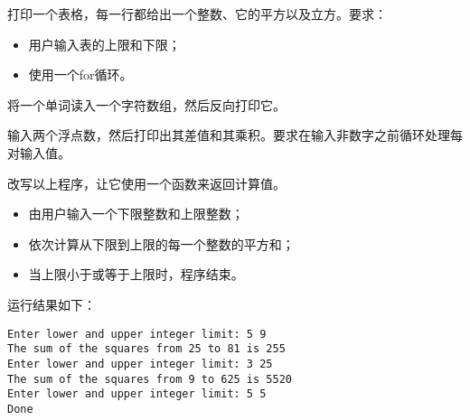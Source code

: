 \begin{frame}[fragile]
\begin{biancheng}[5]
打印一个表格，每一行都给出一个整数、它的平方以及立方。要求：
\begin{itemize}
\item 用户输入表的上限和下限；\\[.1in]
\item 使用一个for循环。
\end{itemize}
\end{biancheng}
\end{frame}


% 


\begin{frame}[fragile]
\begin{biancheng}[6]
将一个单词读入一个字符数组，然后反向打印它。
\end{biancheng}
\end{frame}


% 


\begin{frame}[fragile]
\begin{biancheng}[7]
输入两个浮点数，然后打印出其差值和其乘积。要求在输入非数字之前循环处理每对输入值。
\end{biancheng}
\end{frame}


% 


\begin{frame}[fragile]
\begin{biancheng}[8]
改写以上程序，让它使用一个函数来返回计算值。
\end{biancheng}
\end{frame}

\begin{frame}[fragile]
\begin{biancheng}[9]
\begin{itemize}
\item 由用户输入一个下限整数和上限整数；\\[.1in]
\item 依次计算从下限到上限的每一个整数的平方和；\\[.1in]
\item 当上限小于或等于上限时，程序结束。
\end{itemize}
运行结果如下：
\begin{lstlisting}
Enter lower and upper integer limit: 5 9
The sum of the squares from 25 to 81 is 255
Enter lower and upper integer limit: 3 25
The sum of the squares from 9 to 625 is 5520
Enter lower and upper integer limit: 5 5
Done
\end{lstlisting}
\end{biancheng}
\end{frame}

